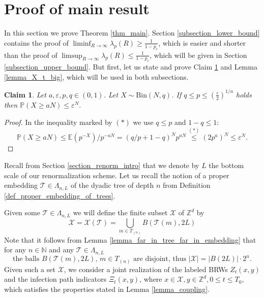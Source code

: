 \documentclass[a4paper,12pt]{article}
\newtheorem  {claim}        [theorem]{Claim}
\begin{document}
\section{Proof of main result}
\label{section_proof_of_main}

In this section we prove Theorem \ref{thm_main}. Section \ref{subsection_lower_bound} contains the proof of
 $\liminf_{R \to \infty } \lambda_p(R) \geq \frac{1}{1-p_c}$, which is easier and shorter than the proof of $\limsup_{R \to \infty } \lambda_p(R) \leq \frac{1}{1-p_c}$,
 which will be given in Section \ref{subsection_upper_bound}. But first, let us state and prove Claim \ref{claim_binomial_largedev_bound} and Lemma \ref{lemma_X_t_big}, which will be used in both subsections.


\begin{claim}\label{claim_binomial_largedev_bound} Let $a, \varepsilon, p, q \in (0,1)$. Let $X \sim \mathrm{Bin}(N,q)$.
If  $q \leq p \leq \left( \frac{\varepsilon}{2} \right)^{1/a}$ holds then  $\mathbb{P}\left( X \geq a N \right) \leq \varepsilon^N. $
\end{claim}
\begin{proof} In the inequality marked by $(*)$ we use $q \leq p$ and $1-q \leq 1$:
\begin{equation}
\mathbb{P}\left( X \geq a N \right) \leq  \mathbb{E}\left( p^{-X} \right) / p^{-aN} =
   (q/p+1-q)^N p^{aN} \stackrel{(*)}{\leq} \left( 2 p^a \right)^N \leq \varepsilon^N.
   \end{equation}
\end{proof}


Recall from Section \ref{section_renorm_intro} that we denote by $L$ the bottom scale of our renormalization scheme. Let us  recall the notion of a proper embedding $\mathcal{T} \in \Lambda_{n,L}$ of the dyadic tree of depth $n$ from Definition \ref{def_proper_embedding_of_trees}.

 Given some  $\mathcal{T} \in \Lambda_{n,L}$
we will define the finite subset $\mathcal{X}$ of $\mathbb{Z}^d$ by
\begin{equation}\label{mathcal_X_tree}
 \mathcal{X}=\mathcal{X}(\mathcal{T})= \bigcup_{m  \in T_{(n)}} B( \mathcal{T}(m),2L)
\end{equation}
Note that it follows from Lemma \ref{lemma_far_in_tree_far_in_embedding} that for any $n  \in \mathbb{N}$ and any $\mathcal{T} \in \Lambda_{n,L}$
\begin{equation}\label{disjoint_X_cardinality}
 \text{the balls } B(\mathcal{T}(m), 2L ), \, m \in  T_{(n)} \text{ are disjoint, thus } |\mathcal{X}|=|B(2L)|\cdot 2^n.
\end{equation}
 Given such a set $\mathcal{X}$, we consider a joint realization of the labeled BRWs $Z_t(x,y)$ and the infection path indicators $\Xi_t(x,y)$, where $x \in \mathcal{X}, y \in \mathbb{Z}^d, 0 \leq t \leq T_0$, which satisfies the properties stated in Lemma  \ref{lemma_coupling}.
\end{document}
